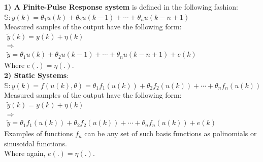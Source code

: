 \begin{example}
\textbf{1) A Finite-Pulse Response system} is defined in the following fashion:\\
    \(\mathbb{S}: y(k) = \theta_1 u(k) + \theta_2 u(k-1) + \cdots + \theta_n u(k-n+1)\)\\
  
Measured samples of the output have the following form:\\
\(
\begin{array}{l}
\tilde{y}(k) = y(k) + \eta(k)\\
\Rightarrow\\
\tilde{y} = \theta_1 u(k) + \theta_2 u(k-1) + \cdots + \theta_n u(k-n+1) + e(k)
\end{array}
\)\\
Where \(e(.) = \eta(.) \).\\

\textbf{2) Static Systems}: \\
\(\mathbb{S}: y(k) = f(u(k),\theta) = \theta_1 f_1(u(k)) + \theta_2 f_2(u(k)) + \cdots + \theta_n f_n(u(k))\)\\
Measured samples of the output have the following form:\\
\(
\begin{array}{l}
\tilde{y}(k) = y(k) + \eta(k)\\
\Rightarrow\\
\tilde{y} = \theta_1 f_1(u(k)) + \theta_2 f_2(u(k)) + \cdots + \theta_n f_n(u(k)) + e(k)
\end{array}
\)\\
Examples of functions \(f_n\) can be any set of such basis functions as polinomials or sinusoidal functions.\\
Where again, \(e(.) = \eta(.) \).\\
\begin{center}
\end{center}
\end{example}
